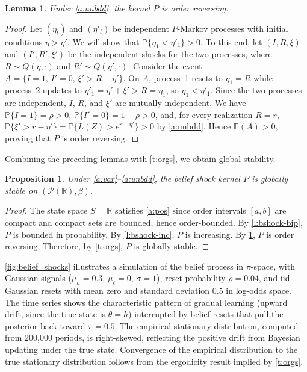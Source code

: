 \documentclass[12pt,reqno]{amsart}
\numberwithin{equation}{section}
\newtheorem{lemma}{Lemma}[section]
\newtheorem{proposition}{Proposition}[section]
\theoremstyle{definition}
\newcommand{\1}{\mathbbm{1}}
\newcommand{\RR}{\mathbb{R}}
\newcommand{\PP}{\mathbb P}
\newcommand{\pP}{\mathscr{P}}
\begin{document}
\begin{lemma}\label{l:bshock-or}
    Under {\rm \ref{a:unbdd}}, the kernel $P$ is order reversing.
\end{lemma}

\begin{proof}
    Let $(\eta_t)$ and $(\eta'_t)$ be independent $P$-Markov processes
    with initial conditions $\eta > \eta'$.
    We will show that $\PP\{\eta_1 < \eta'_1\} > 0$.  To this end,
    let $(I, R, \xi)$ and $(I', R', \xi')$ be the independent shocks for the two processes,
    where $R \sim Q(\eta, \cdot)$ and $R' \sim Q(\eta', \cdot)$.
    Consider the event $A = \{I = 1,\, I' = 0,\, \xi' > R - \eta'\}$.
    On $A$, process~1 resets to $\eta_1 = R$ while process~2 updates to
    $\eta'_1 = \eta' + \xi' > R = \eta_1$, so $\eta_1 < \eta'_1$.
    Since the two processes are independent, $I$, $R$, and $\xi'$ are mutually
    independent.  We have $\PP\{I = 1\} = \rho > 0$, $\PP\{I' = 0\} = 1 - \rho > 0$,
    and, for every realization $R = r$,
    $\PP\{\xi' > r - \eta'\} = \PP\{L(Z) > e^{r-\eta'}\} > 0$ by \ref{a:unbdd}.
    Hence $\PP(A) > 0$, proving that $P$ is order reversing.
\end{proof}

Combining the preceding lemmas with \cref{t:orgs}, we obtain global stability.

\begin{proposition}\label{p:bshock-stable}
    Under {\rm \ref{a:var}--\ref{a:unbdd}}, the belief shock kernel $P$
    is globally stable on $(\pP(\RR), \beta)$.
\end{proposition}

\begin{proof}
    The state space $S = \RR$ satisfies \cref{a:pos} since order intervals
    $[a, b]$ are compact and compact sets are bounded, hence order-bounded.
    By \cref{l:bshock-bip}, $P$ is bounded in probability.
    By \cref{l:bshock-inc}, $P$ is increasing.
    By \cref{l:bshock-or}, $P$ is order reversing.
    Therefore, by \cref{t:orgs}, $P$ is globally stable.
\end{proof}

\cref{fig:belief_shocks} illustrates a simulation of the belief process in
$\pi$-space, with Gaussian signals ($\mu_h = 0.3$, $\mu_\ell = 0$, $\sigma
= 1$), reset probability $\rho = 0.04$, and {\sc iid} Gaussian resets with
mean zero and standard deviation $0.5$ in log-odds space. The time series
shows the characteristic pattern of gradual learning (upward drift, since
the true state is $\theta = h$) interrupted by belief resets that pull the
posterior back toward $\pi = 0.5$. The empirical stationary distribution,
computed from 200{,}000 periods, is right-skewed, reflecting the positive
drift from Bayesian updating under the true state. Convergence of the
empirical distribution to the true stationary distribution follows from the
ergodicity result implied by \cref{t:orgs}.
\end{document}
